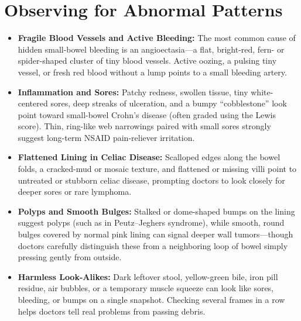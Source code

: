 \section{Observing for Abnormal Patterns}
\begin{itemize}
    \item \textbf{Fragile Blood Vessels and Active Bleeding:} The most common cause of hidden small-bowel bleeding is an angioectasia---a flat, bright-red, fern- or spider-shaped cluster of tiny blood vessels. Active oozing, a pulsing tiny vessel, or fresh red blood without a lump points to a small bleeding artery.
    \item \textbf{Inflammation and Sores:} Patchy redness, swollen tissue, tiny white-centered sores, deep streaks of ulceration, and a bumpy ``cobblestone'' look point toward small-bowel Crohn's disease (often graded using the Lewis score). Thin, ring-like web narrowings paired with small sores strongly suggest long-term NSAID pain-reliever irritation.
    \item \textbf{Flattened Lining in Celiac Disease:} Scalloped edges along the bowel folds, a cracked-mud or mosaic texture, and flattened or missing villi point to untreated or stubborn celiac disease, prompting doctors to look closely for deeper sores or rare lymphoma.
    \item \textbf{Polyps and Smooth Bulges:} Stalked or dome-shaped bumps on the lining suggest polyps (such as in Peutz--Jeghers syndrome), while smooth, round bulges covered by normal pink lining can signal deeper wall tumors---though doctors carefully distinguish these from a neighboring loop of bowel simply pressing gently from outside.
    \item \textbf{Harmless Look-Alikes:} Dark leftover stool, yellow-green bile, iron pill residue, air bubbles, or a temporary muscle squeeze can look like sores, bleeding, or bumps on a single snapshot. Checking several frames in a row helps doctors tell real problems from passing debris.
\end{itemize}

